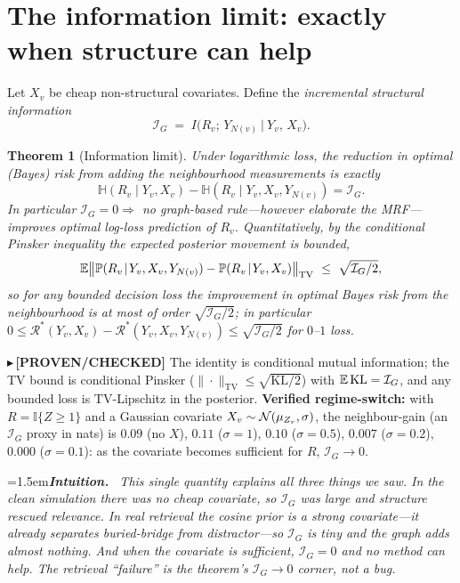 \documentclass[11pt]{article}
\newtheorem{theorem}{Theorem}
\newcommand{\PROVEN}[1]{{\color{teal}\small$\blacktriangleright$\,\textbf{[PROVEN/CHECKED]} #1}}
\newenvironment{intuition}{\par\smallskip\noindent\hangindent=1.5em\textbf{\itshape Intuition.}\itshape\ \ignorespaces}{\par\smallskip}
\renewcommand{\Pr}{\mathbb{P}}\newcommand{\I}{\mathbb{I}}\newcommand{\HH}{\mathbb{H}}
\begin{document}
\section{The information limit: exactly when structure can help}
Let $X_v$ be cheap non-structural covariates. Define the \emph{incremental structural information}
\begin{equation}\label{eq:IG}
  \mathcal I_G \;=\; I\big(R_v;\,Y_{N(v)}\ \big|\ Y_v,\,X_v\big).
\end{equation}
\begin{theorem}[Information limit]\label{thm:info}
Under logarithmic loss, the reduction in optimal (Bayes) risk from adding the neighbourhood measurements is
exactly
\[
  \HH(R_v\mid Y_v,X_v)-\HH(R_v\mid Y_v,X_v,Y_{N(v)})=\mathcal I_G .
\]
In particular $\mathcal I_G=0\Rightarrow$ \emph{no} graph-based rule---however elaborate the MRF---improves optimal
log-loss prediction of $R_v$. \emph{Quantitatively}, by the conditional Pinsker inequality the expected
posterior movement is bounded,
\[
   \E\big\|\Pr(R_v\!\mid\!Y_v,X_v,Y_{N(v)})-\Pr(R_v\!\mid\!Y_v,X_v)\big\|_{\mathrm{TV}}\ \le\ \sqrt{\mathcal I_G/2},
\]
so for \emph{any} bounded decision loss the improvement in optimal Bayes risk from the neighbourhood is at most of
order $\sqrt{\mathcal I_G/2}$; in particular $0\le\mathcal R^\ast(Y_v,X_v)-\mathcal R^\ast(Y_v,X_v,Y_{N(v)})\le
\sqrt{\mathcal I_G/2}$ for $0$--$1$ loss.
\end{theorem}
\PROVEN{The identity is conditional mutual information; the TV bound is conditional Pinsker
($\|\cdot\|_{\mathrm{TV}}\le\sqrt{\mathrm{KL}/2}$) with $\mathbb{E}\,\mathrm{KL}=\mathcal I_G$, and any bounded loss is
$\mathrm{TV}$-Lipschitz in the posterior. \textbf{Verified regime-switch:} with $R=\I\{Z\ge1\}$ and a Gaussian
covariate $X_v\sim\mathcal{N}(\mu_{Z_v},\sigma)$, the neighbour-gain (an $\mathcal I_G$ proxy in nats) is $0.09$ (no $X$),
$0.11$ ($\sigma{=}1$), $0.10$ ($\sigma{=}0.5$), $0.007$ ($\sigma{=}0.2$), $0.000$ ($\sigma{=}0.1$): as the
covariate becomes sufficient for $R$, $\mathcal I_G\to0$.}
\begin{intuition}
This single quantity explains all three things we saw. In the clean simulation there was no cheap covariate, so
$\mathcal I_G$ was large and structure rescued relevance. In real retrieval the cosine prior is a \emph{strong}
covariate---it already separates buried-bridge from distractor---so $\mathcal I_G$ is tiny and the graph adds
almost nothing. And when the covariate is sufficient, $\mathcal I_G=0$ and \emph{no} method can help. The
retrieval ``failure'' is the theorem's $\mathcal I_G\!\to\!0$ corner, not a bug.
\end{intuition}
\end{document}
